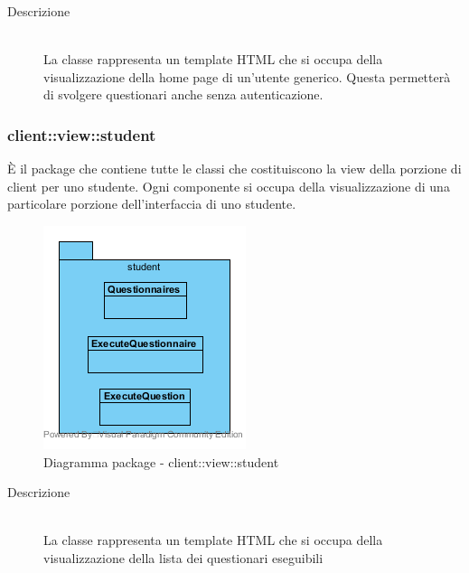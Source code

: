 \vspace{0.5cm}
\hypertarget{client::view::public::Home}{}
\begin{description}
\item[Descrizione] \hfill \\
La classe rappresenta un template HTML che si occupa della visualizzazione della home page di un'utente generico. Questa permetterà di svolgere questionari anche senza autenticazione.
\end{description}

\vspace{0.5cm}
\subsubsection{client::view::student}
È il package che contiene tutte le classi che costituiscono la view della porzione di client per uno studente. Ogni componente si occupa della visualizzazione di una particolare porzione dell'interfaccia di uno studente.\begin{center}
	\begin{figure}[H]
		\centering \includegraphics[scale=4, max width=\textwidth, max height=\myheight]{../img/diagrammiClassi/client/view/student.png}
		\caption{Diagramma package - client::view::student}
	\end{figure}
\end{center}\hypertarget{client::view::student::Questionnaires}{}
\begin{description}
\item[Descrizione] \hfill \\
La classe rappresenta un template HTML che si occupa della visualizzazione della lista dei questionari eseguibili
\end{description}

